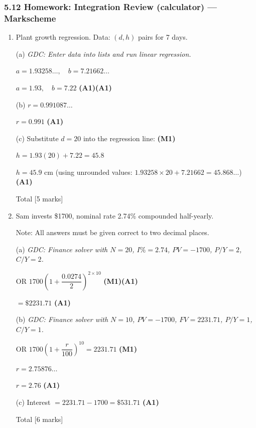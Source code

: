 \documentclass[12pt, twoside]{article}
\begin{document}
\subsubsection*{5.12 Homework: Integration Review (calculator) --- Markscheme}

\begin{enumerate}[itemsep=0.4cm]

\item Plant growth regression. Data: $(d, h)$ pairs for 7 days.

(a) \emph{GDC: Enter data into lists and run linear regression.}

$a = 1.93258\ldots, \quad b = 7.21662\ldots$

$a = 1.93, \quad b = 7.22$ \hfill \textbf{(A1)(A1)}

\medskip
(b) $r = 0.991087\ldots$

$r = 0.991$ \hfill \textbf{(A1)}

\medskip
(c) Substitute $d = 20$ into the regression line: \hfill \textbf{(M1)}

$h = 1.93(20) + 7.22 = 45.8$

$h = 45.9$ cm (using unrounded values: $1.93258 \times 20 + 7.21662 = 45.868\ldots$)
\hfill \textbf{(A1)}

\hfill Total [5 marks]

\bigskip

\item Sam invests \$1700, nominal rate 2.74\% compounded half-yearly.

Note: All answers must be given correct to two decimal places.

\medskip
(a) \emph{GDC: Finance solver with $N = 20$, $I\% = 2.74$, $PV = -1700$,
$P/Y = 2$, $C/Y = 2$.}

OR $1700\!\left(1 + \dfrac{0.0274}{2}\right)^{2 \times 10}$ \hfill \textbf{(M1)(A1)}

$= \$2231.71$ \hfill \textbf{(A1)}

\medskip
(b) \emph{GDC: Finance solver with $N = 10$, $PV = -1700$, $FV = 2231.71$,
$P/Y = 1$, $C/Y = 1$.}

OR $1700\!\left(1 + \dfrac{r}{100}\right)^{10} = 2231.71$ \hfill \textbf{(M1)}

$r = 2.75876\ldots$

$r = 2.76$ \hfill \textbf{(A1)}

\medskip
(c) Interest $= 2231.71 - 1700 = \$531.71$ \hfill \textbf{(A1)}

\hfill Total [6 marks]


\end{enumerate}
\end{document}
